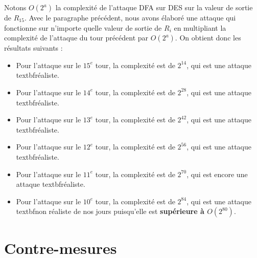 \documentclass[12pt,a4paper]{report}
\begin{document}
Notons $O(2^a)$ la complexité de l'attaque DFA sur DES sur la valeur de sortie de $R_{15}$. Avec le paragraphe précédent, nous avons élaboré une attaque qui fonctionne sur n'importe quelle valeur de sortie de $R_i$ en multipliant la complexité de l'attaque du tour précédent par $O(2^a)$. On obtient donc les résultats suivants : 

\begin{itemize}
	\item Pour l'attaque sur le $15^e$ tour, la complexité est de $2^{14}$, qui est une attaque textbf{réaliste}. 
	\item Pour l'attaque sur le $14^e$ tour, la complexité est de $2^{28}$, qui est une attaque textbf{réaliste}. 
	\item Pour l'attaque sur le $13^e$ tour, la complexité est de $2^{42}$, qui est une attaque textbf{réaliste}. 
	\item Pour l'attaque sur le $12^e$ tour, la complexité est de $2^{56}$, qui est une attaque textbf{réaliste}. 
	\item Pour l'attaque sur le $11^e$ tour, la complexité est de $2^{70}$, qui est encore une attaque textbf{réaliste}. 
	\item Pour l'attaque sur le $10^e$ tour, la complexité est de $2^{84}$, qui est une attaque textbf{non réaliste} de nos jours puisqu'elle est \textbf{supérieure à $O(2^{80})$}. 
	
\end{itemize}

\section{Contre-mesures}
\end{document}
